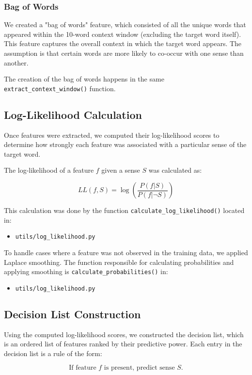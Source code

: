 \documentclass[journal,onecolumn]{IEEEtran}
\begin{document}
\subsubsection{Bag of Words}
We created a "bag of words" feature, which consisted of all the unique words that appeared within the 10-word context window (excluding the target word itself). This feature captures the overall context in which the target word appears. The assumption is that certain words are more likely to co-occur with one sense than another.

The creation of the bag of words happens in the same \texttt{extract\_context\_window()} function.

\subsection{Log-Likelihood Calculation}
Once features were extracted, we computed their log-likelihood scores to determine how strongly each feature was associated with a particular sense of the target word.

The log-likelihood of a feature \( f \) given a sense \( S \) was calculated as:

\[
LL(f, S) = \log\left(\frac{P(f | S)}{P(f | \neg S)}\right)
\]

This calculation was done by the function \texttt{calculate\_log\_likelihood()} located in:
\begin{itemize}
    \item \texttt{utils/log\_likelihood.py}
\end{itemize}

To handle cases where a feature was not observed in the training data, we applied Laplace smoothing. The function responsible for calculating probabilities and applying smoothing is \texttt{calculate\_probabilities()} in:
\begin{itemize}
    \item \texttt{utils/log\_likelihood.py}
\end{itemize}

\subsection{Decision List Construction}
Using the computed log-likelihood scores, we constructed the decision list, which is an ordered list of features ranked by their predictive power. Each entry in the decision list is a rule of the form:

\[
\text{If feature } f \text{ is present, predict sense } S.
\]
\end{document}

